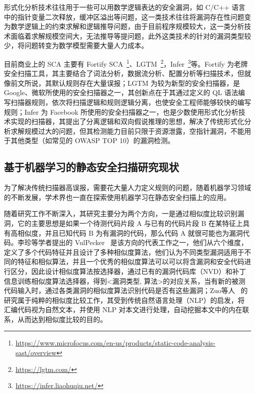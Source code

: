 形式化分析技术往往用于一些可以用数学逻辑表达的安全漏洞，如 C/C++ 语言中的指针变量二次释放，缓冲区溢出等问题，这一类技术往往将漏洞存在性问题变为数学逻辑上的约束求解和逻辑推导问题，由于目前程序规模较大，这一类分析技术面临着求解规模空间大，无法推导等提问题，此外这类技术的针对的漏洞类型较少，将问题转变为数学模型需要大量人力成本。

目前商业上的 SCA 主要有 Fortify SCA~\footnote{\url{https://www.microfocus.com/en-us/products/static-code-analysis-sast/overview}}、LGTM~\footnote{\url{https://lgtm.com/}}，Infer~\footnote{\url{https://infer.liaohuqiu.net/}}等。Fortify 为老牌安全扫描工具，其主要结合了词法分析，数据流分析、配置分析等扫描技术，但就像前文所说，其默认规则存在大量误报；LGTM 为较为新型的安全扫描器，是 Google、微软所使用的安全扫描器之一，其创新点在于其通过定义的 QL 语法编写扫描器规则，依次将扫描逻辑和规则逻辑分离，也使安全工程师能够较快的编写规则；Infer 为 Facebook 所使用的安全扫描器之一，也是少数使用形式化分析技术实现的扫描器，其提出了分离逻辑和双向假说推理的思想，解决了传统形式化分析求解规模过大的问题，但其检测能力目前只限于资源泄露，空指针漏洞，不能用于其他类型（如常见的 OWASP TOP 10）的漏洞检测。\\

\subsection{基于机器学习的静态安全扫描研究现状}

为了解决传统扫描器高误报，需要花大量人力定义规则的问题，随着机器学习领域的不断发展，学术界也一直在探索使用机器学习在静态安全扫描上的应用。

随着研究工作不断深入，其研究主要分为两个方向，一是通过相似度比较识别漏洞，它的主要思想是如果一个待测代码片段 A 与已有的代码片段 B 在某特征上具有高相似度，并且已知代码 B 为有漏洞的代码，那么代码 A 就很可能也为漏洞代码。李珍等学者提出的 VulPecker~\cite{li2016vulpecker} 是该方向的代表工作之一，他们从六个维度，定义了多个代码特征并且设计了多种相似度算法，他们认为不同类型漏洞适用于不同的特征和相似算法，并且一个优秀的相似度算法可以可以将含漏洞和安全代码进行区分，因此设计相似度算法按选择器，通过已有的漏洞代码库（NVD）和补丁信息训练相似度算法选择器，得到<漏洞类型, 算法>的对应关系，当有新的被测代码输入时，通过各类漏洞的相似度算法识别代码是否有这些漏洞；Zuo等人~\cite{Zuo2019} 的研究属于纯粹的相似度比较工作，其受到传统自然语言处理（NLP）的启发，将汇编代码视为自然文本，并使用 NLP 对本文进行处理，自动挖掘本文中的内在联系，从而达到相似度比较的目的。

